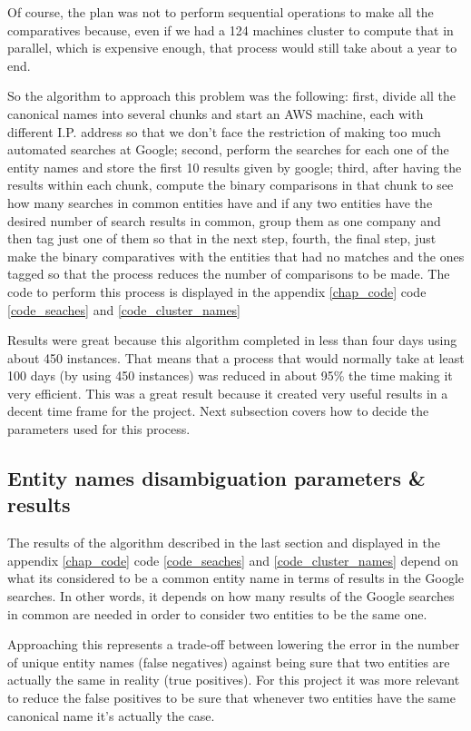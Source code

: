 Of course, the plan was not to perform sequential operations to make all the comparatives because, even if we had a 124 machines cluster to compute that in parallel, which is expensive enough, that process would still take about a year to end.

So the algorithm to approach this problem was the following: first, divide all the canonical names into several chunks and start an AWS machine, each with different I.P. address so that we don't face the restriction of making too much automated searches at Google; second, perform the searches for each one of the entity names and store the first 10 results given by google; third, after having the results within each chunk, compute the binary comparisons in that chunk to see how many searches in common entities have and if any two entities have the desired number of search results in common, group them as one company and then tag just one of them so that in the next step, fourth, the final step, just make the binary comparatives with the entities that had no matches and the ones tagged so that the process reduces the number of comparisons to be made. The code to perform this process is displayed in the  appendix \ref{chap_code} code \ref{code_seaches} and \ref{code_cluster_names}

Results were great because this algorithm completed in less than four days using about 450 instances. That means that a process that would normally take at least 100 days (by using 450 instances) was reduced in about 95\% the time making it very efficient. This was a great result because it created very useful results in a decent time frame for the project. Next subsection covers how to decide the parameters used for this process.

\subsection{Entity names disambiguation parameters \& results}

The results of the algorithm described in the last section and displayed in  the  appendix \ref{chap_code} code \ref{code_seaches} and \ref{code_cluster_names} depend on what its  considered to be a common entity name in terms of results in the Google searches. In other words, it depends on how many results of the Google searches in common are needed in order to consider two entities to be the same one.

Approaching this represents a trade-off between lowering the error in the number of unique entity names (false negatives) against being sure that two entities are actually the same in reality (true positives). For this project it was more relevant to reduce the false positives to be sure that whenever two entities have the same canonical name it's actually the case.

